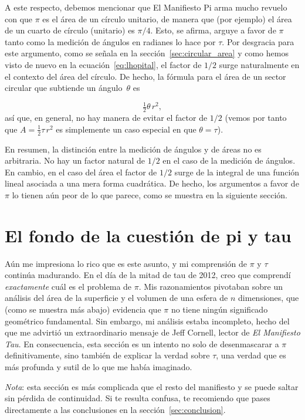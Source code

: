 A este respecto, debemos mencionar que El Manifiesto Pi arma mucho revuelo con que $\pi$ es el área de un círculo unitario, de manera que (por ejemplo) el área de un cuarto de círculo (unitario) es $\pi/4$. Esto, se afirma, arguye a favor de $\pi$ tanto como la medición de ángulos en radianes lo hace por $\tau$. Por desgracia para este argumento, como se señala en la sección~\ref{sec:circular_area} y como hemos visto de nuevo en la ecuación~\eqref{eq:lhopital}, el factor de $1/2$ surge naturalmente en el contexto del área del círculo. De hecho, la fórmula para el área de un sector circular que subtiende un ángulo~$\theta$ es

\[
\tfrac{1}{2}\theta\, r^2,
\]
así que, en general, no hay manera de evitar el factor de $1/2$ (vemos por tanto que $A = \frac{1}{2} \tau\, r^2$ es simplemente un caso especial en que  $\theta = \tau$).

En resumen, la distinción entre la medición de ángulos y de áreas no es arbitraria. No hay un factor natural de $1/2$ en el caso de la medición de ángulos. En cambio, en el caso del área el factor de $1/2$ surge de la integral de una función lineal asociada a una mera forma cuadrática. De hecho, los argumentos a favor de $\pi$ lo tienen aún peor de lo que parece, como se muestra en la siguiente sección.


\section{El fondo de la cuestión de pi y tau} %
\label{sec:getting_to_the_bottom_of_pi}

Aún me impresiona lo rico que es este asunto, y mi comprensión de $\pi$ y $\tau$ continúa madurando. En el día de la mitad de tau de 2012, creo que comprendí \emph{exactamente} cuál es el problema de $\pi$. Mis razonamientos pivotaban sobre un análisis del área de la superficie y el volumen de una esfera de $n$ dimensiones, que (como se muestra más abajo) evidencia que $\pi$ no tiene ningún significado geométrico fundamental. Sin embargo, mi análisis estaba incompleto, hecho del que me advirtió un extraordinario mensaje de Jeff Cornell, lector de \emph{El Manifiesto Tau}. En consecuencia, esta sección es un intento no solo de desenmascarar a $\pi$ definitivamente, sino también de explicar la verdad sobre $\tau$, una verdad que es más profunda y sutil de lo que me había imaginado.

\emph{Nota}: esta sección es más complicada que el resto del manifiesto y se puede saltar sin pérdida de continuidad. Si te resulta confusa, te recomiendo que pases directamente a las conclusiones en la sección~\ref{sec:conclusion}.

